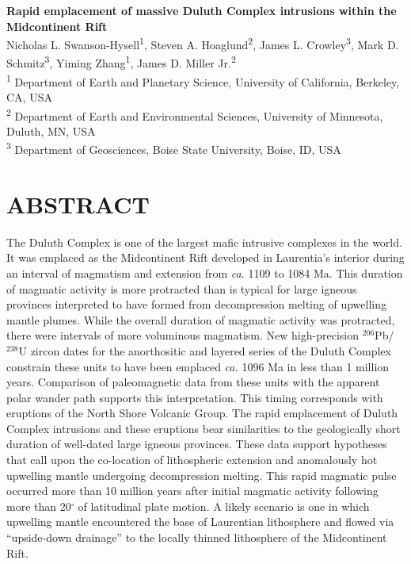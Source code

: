 \documentclass[11pt,letterpaper]{article}
\begin{document}
\begin{flushleft}
{\Large \textbf{Rapid emplacement of massive Duluth Complex intrusions within the Midcontinent Rift}}
\\
Nicholas L. Swanson-Hysell\textsuperscript{1}, Steven A. Hoaglund\textsuperscript{2}, James L. Crowley\textsuperscript{3}, Mark D. Schmitz\textsuperscript{3}, Yiming Zhang\textsuperscript{1}, James D. Miller Jr.\textsuperscript{2}
\\
\bigskip
\textsuperscript{1} Department of Earth and Planetary Science, University of California, Berkeley, CA, USA\\
\textsuperscript{2} Department of Earth and Environmental Sciences, University of Minnesota, Duluth, MN, USA \\
\textsuperscript{3} Department of Geosciences, Boise State University, Boise, ID, USA
\bigskip
\end{flushleft}

\linenumbers

\section*{ABSTRACT}

The Duluth Complex is one of the largest mafic intrusive complexes in the world. It was emplaced as the Midcontinent Rift developed in Laurentia's interior during an interval of magmatism and extension from \textit{ca.} 1109 to 1084 Ma. This duration of magmatic activity is more protracted than is typical for large igneous provinces interpreted to have formed from decompression melting of upwelling mantle plumes. While the overall duration of magmatic activity was protracted, there were intervals of more voluminous magmatism. New high-precision $^{206}$Pb/$^{238}$U zircon dates for the anorthositic and layered series of the Duluth Complex constrain these units to have been emplaced \textit{ca.} 1096 Ma in less than 1 million years. Comparison of paleomagnetic data from these units with the apparent polar wander path supports this interpretation. This timing corresponds with eruptions of the North Shore Volcanic Group. The rapid emplacement of Duluth Complex intrusions and these eruptions bear similarities to the geologically short duration of well-dated large igneous provinces. These data support hypotheses that call upon the co-location of lithospheric extension and anomalously hot upwelling mantle undergoing decompression melting. This rapid magmatic pulse occurred more than 10 million years after initial magmatic activity following more than 20$^{\circ}$$\;$of latitudinal plate motion. A likely scenario is one in which upwelling mantle encountered the base of Laurentian lithosphere and flowed via ``upside-down drainage'' to the locally thinned lithosphere of the Midcontinent Rift.
\end{document}
